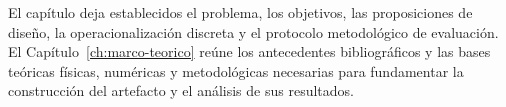 El capítulo deja establecidos el problema, los objetivos, las proposiciones de diseño, la operacionalización discreta y el protocolo metodológico de evaluación. El Capítulo~\ref{ch:marco-teorico} reúne los antecedentes bibliográficos y las bases teóricas físicas, numéricas y metodológicas necesarias para fundamentar la construcción del artefacto y el análisis de sus resultados.
